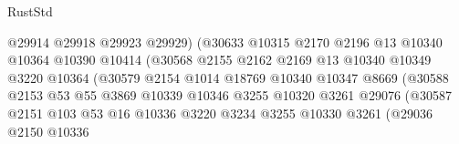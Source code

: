 \begin{lexlean}{RustStd}
\begin{coremodule}
                                      @29914
                                      @29918
                                      @29923
                                      @29929)
                                    (@30633
                                      @10315
                                      @2170
                                      @2196
                                      @13
                                      @10340
                                      @10364
                                      @10390
                                      @10414
                                      (@30568
                                        @2155
                                        @2162
                                        @2169
                                        @13
                                        @10340
                                        @10349
                                        @3220
                                        @10364
                                        (@30579
                                          @2154
                                          @1014
                                          @18769
                                          @10340
                                          @10347
                                          @8669
                                          (@30588
                                            @2153
                                            @53
                                            @55
                                            @3869
                                            @10339
                                            @10346
                                            @3255
                                            @10320
                                            @3261
                                            @29076
                                            (@30587
                                              @2151
                                              @103
                                              @53
                                              @16
                                              @10336
                                              @3220
                                              @3234
                                              @3255
                                              @10330
                                              @3261
                                              (@29036
                                                @2150
                                                @10336

\end{coremodule}
\end{lexlean}
